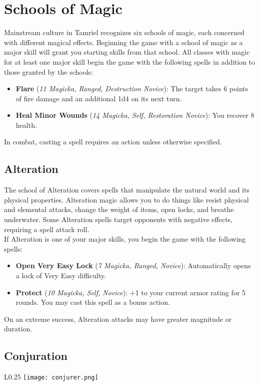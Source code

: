 \section{Schools of Magic}
Mainstream culture in Tamriel recognizes six schools of magic, each concerned with different magical effects. Beginning the game with a school of magic as a major skill will grant you starting skills from that school. All classes with magic for at least one major skill begin the game with the following spells in addition to those granted by the schools:

\begin{itemize}
	\item \textbf{Flare} (\textit{11 Magicka, Ranged, Destruction Novice}): The target takes 6 points of fire damage and an additional 1d4 on its next turn.
	\item \textbf{Heal Minor Wounds} (\textit{14 Magicka, Self, Restoration Novice}): You recover 8 health.
\end{itemize}

In combat, casting a spell requires an action unless otherwise specified.

\subsection{Alteration}
The school of Alteration covers spells that manipulate the natural world and its physical properties. Alteration magic allows you to do things like resist physical and elemental attacks, change the weight of items, open locks, and breathe underwater. Some Alteration spells target opponents with negative effects, requiring a spell attack roll.\\

If Alteration is one of your major skills, you begin the game with the following spells:
\begin{itemize}
	\item \textbf{Open Very Easy Lock} (\textit{7 Magicka, Ranged, Novice}): Automatically opens a lock of Very Easy difficulty.
	\item \textbf{Protect} (\textit{10 Magicka, Self, Novice}): +1 to your current armor rating for 5 rounds. You may cast this spell as a bonus action.
\end{itemize}

On an extreme success, Alteration attacks may have greater magnitude or duration.

\subsection{Conjuration}
\begin{wrapfigure}{L}{0.25\textwidth}
	\texttt{[image: conjurer.png]}
\end{wrapfigure}

